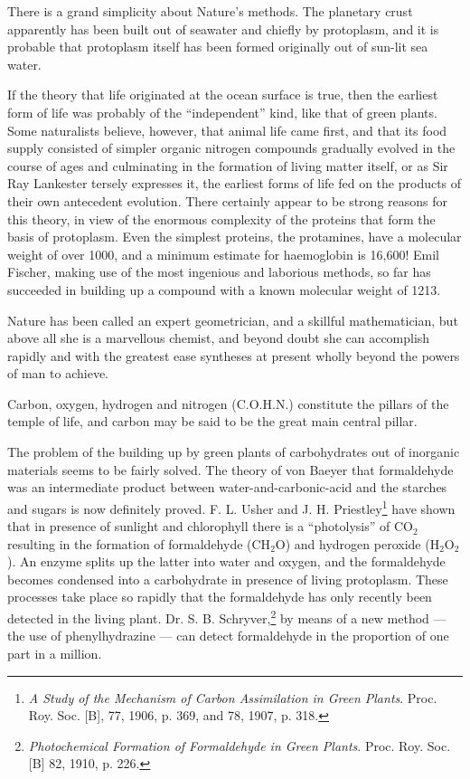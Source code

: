 \documentclass[a4paper, 12pt, oneside]{article}
\begin{document}
There is a grand simplicity about Nature's methods. The planetary crust apparently has been built out of seawater and chiefly by protoplasm, and it is probable that protoplasm itself has been formed originally out of sun-lit sea water.

If the theory that life originated at the ocean surface is true, then the earliest form of life was probably of the ``independent'' kind, like that of green plants. Some naturalists believe, however, that animal life came first, and that its food supply consisted of simpler organic nitrogen compounds gradually evolved in the course of ages and culminating in the formation of living matter itself, or as Sir Ray Lankester tersely expresses it, the earliest forms of life fed on the products of their own antecedent evolution. There certainly appear to be strong reasons for this theory, in view of the enormous complexity of the proteins that form the basis of protoplasm. Even the simplest proteins, the protamines, have a molecular weight of over 1000, and a minimum estimate for haemoglobin is 16,600! Emil Fischer, making use of the most ingenious and laborious methods, so far has succeeded in building up a compound with a known molecular weight of 1213.

Nature has been called an expert geometrician, and a skillful mathematician, but above all she is a marvellous chemist, and beyond doubt she can accomplish rapidly and with the greatest ease syntheses at present wholly beyond the powers of man to achieve.

Carbon, oxygen, hydrogen and nitrogen (C.O.H.N.) constitute the pillars of the temple of life, and carbon may be said to be the great main central pillar.

The problem of the building up by green plants of carbohydrates out of inorganic materials seems to be fairly solved. The theory of von Baeyer that formaldehyde was an intermediate product between water-and-carbonic-acid and the starches and sugars is now definitely proved. F. L. Usher and J. H. Priestley\footnote{\emph{A Study of the Mechanism of Carbon Assimilation in Green Plants}. Proc. Roy. Soc. [B], 77, 1906, p. 369, and 78, 1907, p. 318.} have shown that in presence of sunlight and chlorophyll there is a ``photolysis'' of CO$_{2}$ resulting in the formation of formaldehyde (CH$_{2}$O) and hydrogen peroxide (H$_{2}$O$_{2}$). An enzyme splits up the latter into water and oxygen, and the formaldehyde becomes condensed into a carbohydrate in presence of living protoplasm. These processes take place so rapidly that the formaldehyde has only recently been detected in the living plant. Dr. S. B. Schryver,\footnote{\emph{Photochemical Formation of Formaldehyde in Green Plants}. Proc. Roy. Soc. [B] 82, 1910, p. 226.} by means of a new method --- the use of phenylhydrazine --- can detect formaldehyde in the proportion of one part in a million.
\end{document}
